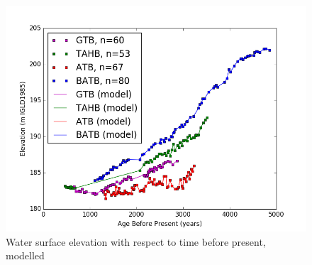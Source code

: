 \begin{figure}[h]
	\includegraphics[width=\linewidth]{data/theData.png}
	\caption{Water surface elevation with respect to time before present, modelled}
	\label{fig:rawDataWithModel}
\end{figure}
%
